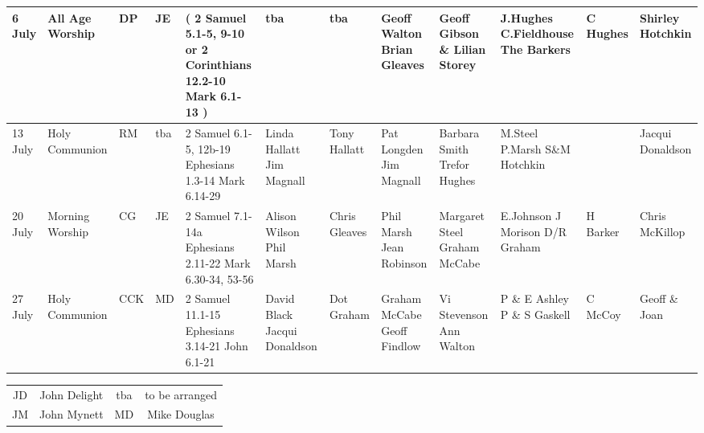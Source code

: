 \documentclass[10pt,a4paper]{article}
\begin{document}
\begin{center}
{\begin{tabular}{|p{1.6cm}|p{1.4cm}|p{0.6cm}|p{0.6cm}|p{3.2cm}|p{2cm}|p{1.5cm}|p{2cm}|p{2.0cm}|p{2.4cm}
|p{1.6cm}|p{1.6cm}|}
6 July & All Age Worship & DP & JE & %
{\footnotesize (
2 Samuel 5.1-5, 9-10 or
2 Corinthians 12.2-10
Mark 6.1-13
)}  &    tba & 
tba & Geoff Walton  Brian Gleaves & 
Geoff  Gibson \& Lilian Storey &
J.Hughes \linebreak C.Fieldhouse \linebreak The Barkers
& C Hughes  & Shirley Hotchkin \\
\hline
13 July & Holy Communion
& RM & tba & %
2 Samuel 6.1-5, 12b-19 %
Ephesians 1.3-14 \linebreak
Mark 6.14-29
& Linda Hallatt  Jim Magnall & 
Tony \linebreak Hallatt & Pat Longden  Jim Magnall & 
Barbara Smith \linebreak Trefor Hughes &
M.Steel P.Marsh \linebreak S\&M Hotchkin
&   & Jacqui Donaldson \\
\hline
20 July & Morning Worship  
&  CG & JE & 
2 Samuel 7.1-14a \linebreak
Ephesians 2.11-22 \linebreak
Mark 6.30-34, 53-56
    &  Alison Wilson Phil Marsh &
Chris Gleaves &  Phil Marsh \linebreak Jean Robinson & 
Margaret Steel \linebreak Graham McCabe &
E.Johnson   \linebreak J Morison  \linebreak D/R Graham
& H Barker  &  Chris \linebreak McKillop \\
\hline
27 July & Holy Communion
 & CCK  & MD & 
2 Samuel 11.1-15  \linebreak
Ephesians 3.14-21 \linebreak
John 6.1-21 
    & David Black \linebreak Jacqui Donaldson  & 
Dot Graham &  Graham McCabe \linebreak Geoff Findlow & 
Vi Stevenson Ann Walton &
P \& E Ashley \linebreak P \& S Gaskell
& C McCoy  &   Geoff \& Joan \\
\hline
\end{tabular}
}

\vspace{1em}
\begin{tabular}{|c|c|c|c|}\hline
JD & John Delight 
 &  tba & to be arranged  \\ %
 JM & John Mynett & MD & Mike Douglas \\
   \hline
\end{tabular}
\end{center}
\end{document}

